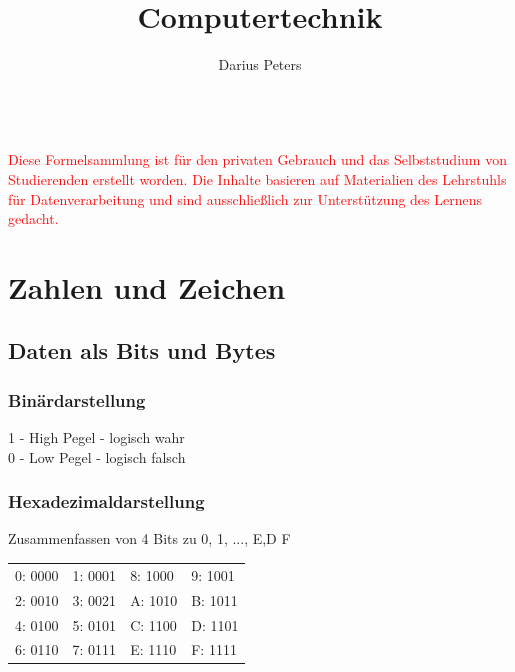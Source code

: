 \documentclass[ngerman, threecolumn, 8pt]{latex4ei/latex4ei_sheet}
\title{Computertechnik}
\author{Darius Peters}                    %
\begin{document}

\ifdefined\GitRevision{}\fi

\maketitle   %
\\
\textcolor{red}{\small Diese Formelsammlung ist für den privaten Gebrauch und das Selbststudium von Studierenden erstellt worden. Die Inhalte basieren auf Materialien des Lehrstuhls für Datenverarbeitung und sind ausschließlich zur Unterstützung des Lernens gedacht.}
\section{Zahlen und Zeichen}
    \subsection{Daten als Bits und Bytes}
	\subsubsection{Binärdarstellung}
	1 - High Pegel - logisch wahr\\
	0 - Low Pegel - logisch falsch
	\subsubsection{Hexadezimaldarstellung}
	Zusammenfassen von 4 Bits zu 0, 1, ..., E,D F\\
	\begin{tabular}{l|l||l|l}
	0: 0000 & 1: 0001 & 8: 1000 & 9: 1001\\
	2: 0010 & 3: 0021 & A: 1010 & B: 1011\\
	4: 0100 & 5: 0101 & C: 1100 & D: 1101\\
	6: 0110 & 7: 0111 & E: 1110 & F: 1111\\
	\end{tabular}
\end{document}
